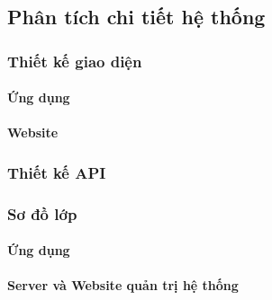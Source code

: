 \documentclass{article}%
\begin{document}
\subsection{Phân tích chi tiết hệ thống}

\subsubsection{Thiết kế giao diện}

\paragraph{Ứng dụng}
\mbox{}

\paragraph{Website}
\mbox{}

\subsubsection{Thiết kế API}


\subsubsection{Sơ đồ lớp}

\paragraph{Ứng dụng}
\mbox{}

\paragraph{Server và Website quản trị hệ thống}
\mbox{}
\end{document}
